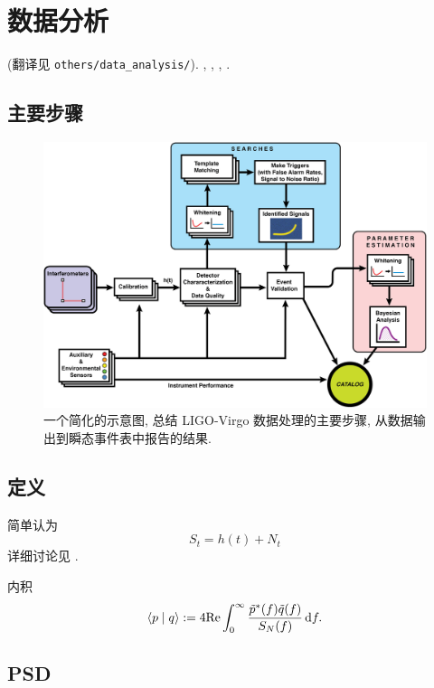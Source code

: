 \chapter{数据分析}

\def\la{\langle}
\def\ra{\rangle}
\cite{Abbott2020} (翻译见 \texttt{others/data\_{}analysis/}). \cite{Maggiore2014}, \cite{Jaranowski2012,Jaranowski2009}, \cite{Finn1992}, \cite{Thrane2019}.

\section{主要步骤}

\begin{figure}[htbp]
    \centering
    \includegraphics[width=\textwidth]{image/data_processing_main_steps.jpg}
    \caption{
        一个简化的示意图, 总结 LIGO-Virgo 数据处理的主要步骤, 从数据输出到瞬态事件表中报告的结果. 
    }
\end{figure}

\section{定义}

简单认为
\begin{equation}
    S_t=h(t)+N_t
\end{equation}
详细讨论见 \cite{Maggiore2014}.

内积
\begin{equation}
    \la p\mid q \ra:=4\text{Re}\int_0^\infty\frac{\tilde{p}^*(f)\tilde{q}(f)}{S_{N}(f)}\,\d f.
\end{equation}

\section{PSD}

